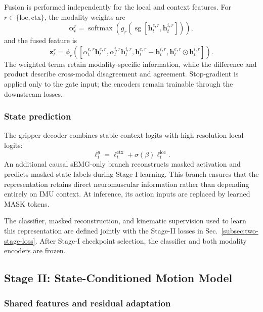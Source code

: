 Fusion is performed independently for the local and context features. For
$r\in\{\mathrm{loc},\mathrm{ctx}\}$, the modality weights are
\begin{equation}
 \boldsymbol{\alpha}^{r}_t=
 \operatorname{softmax}\!\left(
 g_r\!\left(\operatorname{sg}
 [\mathbf h^{e,r}_t,\mathbf h^{i,r}_t]\right)\right),
\end{equation}
and the fused feature is
\begin{equation}
 \mathbf z^r_t=\phi_r\!\left(
 [\alpha^{e,r}_t\mathbf h^{e,r}_t,
  \alpha^{i,r}_t\mathbf h^{i,r}_t,
  \mathbf h^{e,r}_t-\mathbf h^{i,r}_t,
  \mathbf h^{e,r}_t\odot\mathbf h^{i,r}_t]\right).
\end{equation}
The weighted terms retain modality-specific information, while the difference
and product describe cross-modal disagreement and agreement. Stop-gradient is
applied only to the gate input; the encoders remain trainable through the
downstream losses.

\subsubsection{State prediction}

The gripper decoder combines stable context logits with high-resolution local
logits:
\begin{equation}
    \boldsymbol{\ell}^{g}_t
    =\boldsymbol{\ell}^{\mathrm{ctx}}_t
    +\sigma(\beta)\boldsymbol{\ell}^{\mathrm{loc}}_t.
\end{equation}
An additional causal sEMG-only branch reconstructs masked activation and
predicts masked state labels during Stage-I learning. This branch ensures that
the representation retains direct neuromuscular information rather than
depending entirely on IMU context. At inference, its action inputs are replaced
by learned MASK tokens.

The classifier, masked reconstruction, and kinematic supervision used to learn
this representation are defined jointly with the Stage-II losses in
Sec.~\ref{subsec:two-stage-loss}. After Stage-I checkpoint selection, the
classifier and both modality encoders are frozen.

\subsection{Stage II: State-Conditioned Motion Model}

\subsubsection{Shared features and residual adaptation}

